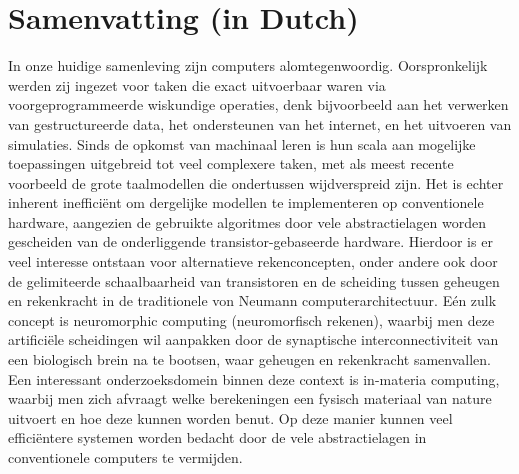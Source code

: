 \chapter*{Samenvatting (in Dutch)}\label{sec:Preface_NL}
In onze huidige samenleving zijn computers alomtegenwoordig.
Oorspronkelijk werden zij ingezet voor taken die exact uitvoerbaar waren via voorgeprogrammeerde wiskundige operaties, denk bijvoorbeeld aan het verwerken van gestructureerde data, het ondersteunen van het internet, en het uitvoeren van simulaties.
Sinds de opkomst van machinaal leren is hun scala aan mogelijke toepassingen uitgebreid tot veel complexere taken, met als meest recente voorbeeld de grote taalmodellen die ondertussen wijdverspreid zijn.
Het is echter inherent ineffici\"ent om dergelijke modellen te implementeren op conventionele hardware, aangezien de gebruikte algoritmes door vele abstractielagen worden gescheiden van de onderliggende transistor-gebaseerde hardware.
Hierdoor is er veel interesse ontstaan voor alternatieve rekenconcepten, onder andere ook door de gelimiteerde schaalbaarheid van transistoren en de scheiding tussen geheugen en rekenkracht in de traditionele von Neumann computerarchitectuur.
E\'en zulk concept is neuromorphic computing (neuromorfisch rekenen), waarbij men deze artifici\"ele scheidingen wil aanpakken door de synaptische interconnectiviteit van een biologisch brein na te bootsen, waar geheugen en rekenkracht samenvallen.
Een interessant onderzoeksdomein binnen deze context is in-materia computing, waarbij men zich afvraagt welke berekeningen een fysisch materiaal van nature uitvoert en hoe deze kunnen worden benut.
Op deze manier kunnen veel effici\"entere systemen worden bedacht door de vele abstractielagen in conventionele computers te vermijden. \\ %

